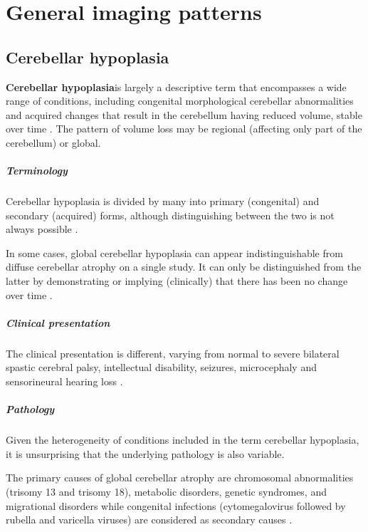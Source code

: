\chapter{General imaging patterns}

\section{Cerebellar hypoplasia}

\textbf{Cerebellar hypoplasia}is largely a descriptive term that encompasses a wide range of conditions, including congenital morphological cerebellar abnormalities and acquired changes that result in the cerebellum having reduced volume, stable over time . The pattern of volume loss may be regional (affecting only part of the cerebellum) or global.

\paragraph{Terminology}

Cerebellar hypoplasia is divided by many into primary (congenital) and secondary (acquired) forms, although distinguishing between the two is not always possible .

In some cases, global cerebellar hypoplasia can appear indistinguishable from diffuse cerebellar atrophy on a single study. It can only be distinguished from the latter by demonstrating or implying (clinically) that there has been no change over time .

\paragraph{Clinical presentation}

The clinical presentation is different, varying from normal to severe bilateral spastic cerebral palsy, intellectual disability, seizures, microcephaly and sensorineural hearing loss .

\paragraph{Pathology}

Given the heterogeneity of conditions included in the term cerebellar hypoplasia, it is unsurprising that the underlying pathology is also variable.

The primary causes of global cerebellar atrophy are chromosomal abnormalities (trisomy 13 and trisomy 18), metabolic disorders, genetic syndromes, and migrational disorders while congenital infections (cytomegalovirus followed by rubella and varicella viruses) are considered as secondary causes .

